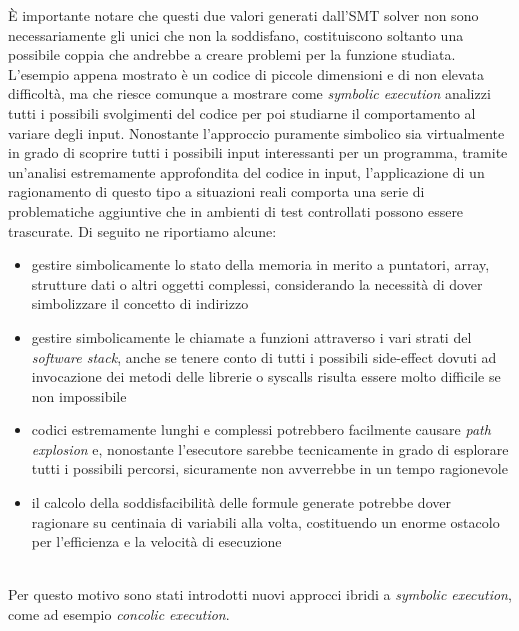 \documentclass[Lau, oneside]{sapthesis}%
\begin{document}
\newpage
È importante notare che questi due valori generati dall'SMT solver non sono necessariamente gli unici che non la soddisfano, costituiscono soltanto una possibile coppia che andrebbe a creare problemi per la funzione studiata.
\newline \newline \newline
L'esempio appena mostrato è un codice di piccole dimensioni e di non elevata difficoltà, ma che riesce comunque a mostrare come \textit{symbolic execution} analizzi tutti i possibili svolgimenti del codice per poi studiarne il comportamento al variare degli input.
\newline
Nonostante l'approccio puramente simbolico sia virtualmente in grado di scoprire tutti i possibili input interessanti per un programma, tramite un'analisi estremamente approfondita del codice in input, l'applicazione di un ragionamento di questo tipo a situazioni reali comporta una serie di problematiche aggiuntive che in ambienti di test controllati possono essere trascurate.
\newline
Di seguito ne riportiamo alcune:
\begin{itemize}
    \item gestire simbolicamente lo stato della memoria in merito a puntatori, array, strutture dati o altri oggetti complessi, considerando la necessità di dover simbolizzare il concetto di indirizzo
    \item gestire simbolicamente le chiamate a funzioni attraverso i vari strati del \textit{software stack}, anche se tenere conto di tutti i possibili side-effect dovuti ad invocazione dei metodi delle librerie o syscalls risulta essere molto difficile se non impossibile
    \item codici estremamente lunghi e complessi potrebbero facilmente causare \textit{path explosion} e, nonostante l'esecutore sarebbe tecnicamente in grado di esplorare tutti i possibili percorsi, sicuramente non avverrebbe in un tempo ragionevole
    \item il calcolo della soddisfacibilità delle formule generate potrebbe dover ragionare su centinaia di variabili alla volta, costituendo un enorme ostacolo per l'efficienza e la velocità di esecuzione
\end{itemize}
\ \\
Per questo motivo sono stati introdotti nuovi approcci ibridi a \textit{symbolic execution}, come ad esempio \textit{concolic execution}.
\end{document}
